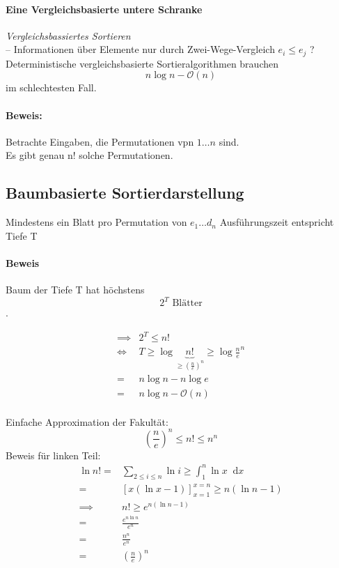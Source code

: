 \documentclass[a4paper]{scrartcl}
\newcommand*\dif{\mathop{}\!\mathrm{d}}
\begin{document}
	\paragraph{Eine Vergleichsbasierte untere Schranke} 
	\emph{Vergleichsbassiertes Sortieren}\\
	-- Informationen über Elemente nur durch Zwei-Wege-Vergleich \( e_i \leq e_j \) ?\\
	Deterministische vergleichsbasierte Sortieralgorithmen brauchen \[ n \log n - \mathcal{O} (n) \] im schlechtesten Fall.\\
	
	\paragraph{Beweis:}
	Betrachte Eingaben, die Permutationen vpn \( 1 \dots n \) sind.\\
	Es gibt genau n! solche Permutationen.
	
	\subsection{Baumbasierte Sortierdarstellung} 
	Mindestens ein Blatt pro Permutation von \( e_1 \dots d_n \) Ausführungszeit entspricht Tiefe T\\
	
	\paragraph{Beweis} 
	Baum der Tiefe T hat höchstens \[ 2^{T} \text{ Blätter} \].
	
	\begin{align*}
		\implies & 2^T \leq n!\\
		\iff & T \geq \log \underbrace{n!}_{\geq (\frac{n}{e})^n} \geq \log \frac{n}{e}^n\\
		=& n \log n - n \log e \\
		=&n \log n - \mathcal{O}(n)\\
	\end{align*}
	
	Einfache Approximation der Fakultät: \[ (\frac{n}{e})^n \leq n! \leq n^n \]
	Beweis für linken Teil:\\
	\begin{align*}
		\ln n! =& \sum_{2 \leq i \leq n} \ln i \geq \int_{1}^{n} \ln x \dif x\\
		=& [x(\ln x - 1)]^{x=n}_{x=1} \geq n(\ln n - 1)\\
		\implies & n! \geq e^{n(\ln n-1)} \\
		=& \frac{e^{n \ln n}}{e^n}\\
		=& \frac{n^n}{e^n} \\
		=& (\frac{n}{e})^n\\
	\end{align*}
	
\end{document}
